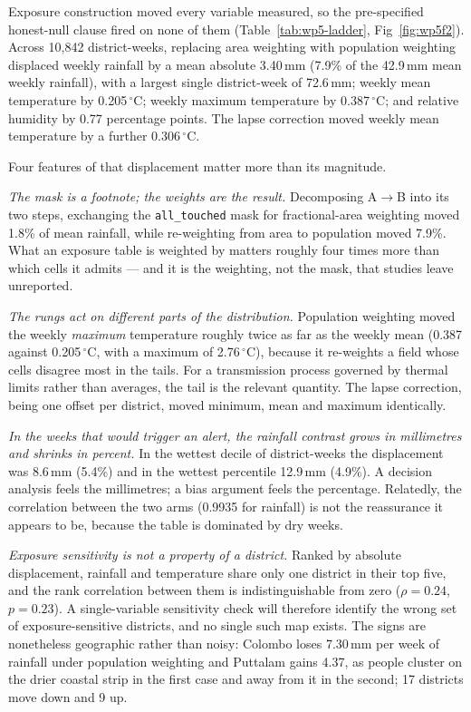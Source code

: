 Exposure construction moved every variable measured, so the pre-specified honest-null clause fired on none of them (Table~\ref{tab:wp5-ladder}, Fig~\ref{fig:wp5f2}). Across 10{,}842 district-weeks, replacing area weighting with population weighting displaced weekly rainfall by a mean absolute 3.40\,mm (7.9\% of the 42.9\,mm mean weekly rainfall), with a largest single district-week of 72.6\,mm; weekly mean temperature by 0.205\,$^{\circ}$C; weekly maximum temperature by 0.387\,$^{\circ}$C; and relative humidity by 0.77 percentage points. The lapse correction moved weekly mean temperature by a further 0.306\,$^{\circ}$C.

Four features of that displacement matter more than its magnitude.

\emph{The mask is a footnote; the weights are the result.} Decomposing A$\to$B into its two steps, exchanging the \texttt{all\_touched} mask for fractional-area weighting moved 1.8\% of mean rainfall, while re-weighting from area to population moved 7.9\%. What an exposure table is weighted by matters roughly four times more than which cells it admits --- and it is the weighting, not the mask, that studies leave unreported.

\emph{The rungs act on different parts of the distribution.} Population weighting moved the weekly \emph{maximum} temperature roughly twice as far as the weekly mean (0.387 against 0.205\,$^{\circ}$C, with a maximum of 2.76\,$^{\circ}$C), because it re-weights a field whose cells disagree most in the tails. For a transmission process governed by thermal limits rather than averages, the tail is the relevant quantity. The lapse correction, being one offset per district, moved minimum, mean and maximum identically.

\emph{In the weeks that would trigger an alert, the rainfall contrast grows in millimetres and shrinks in percent.} In the wettest decile of district-weeks the displacement was 8.6\,mm (5.4\%) and in the wettest percentile 12.9\,mm (4.9\%). A decision analysis feels the millimetres; a bias argument feels the percentage. Relatedly, the correlation between the two arms (0.9935 for rainfall) is not the reassurance it appears to be, because the table is dominated by dry weeks.

\emph{Exposure sensitivity is not a property of a district.} Ranked by absolute displacement, rainfall and temperature share only one district in their top five, and the rank correlation between them is indistinguishable from zero ($\rho=0.24$, $p=0.23$). A single-variable sensitivity check will therefore identify the wrong set of exposure-sensitive districts, and no single such map exists. The signs are nonetheless geographic rather than noisy: Colombo loses 7.30\,mm per week of rainfall under population weighting and Puttalam gains 4.37, as people cluster on the drier coastal strip in the first case and away from it in the second; 17 districts move down and 9 up.

